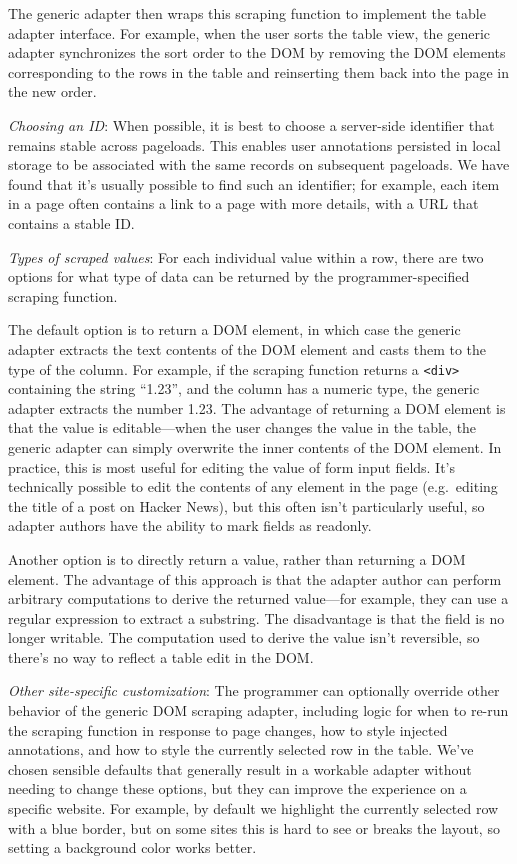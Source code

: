 \documentclass[sigplan,screen,10pt,anonymous,review]{acmart}
\begin{document}
The generic adapter then wraps this scraping function to implement the
table adapter interface. For example, when the user sorts the table
view, the generic adapter synchronizes the sort order to the DOM by
removing the DOM elements corresponding to the rows in the table and
reinserting them back into the page in the new order.

\emph{Choosing an ID}: When possible, it is best to choose a server-side
identifier that remains stable across pageloads. This enables user
annotations persisted in local storage to be associated with the same
records on subsequent pageloads. We have found that it's usually
possible to find such an identifier; for example, each item in a page
often contains a link to a page with more details, with a URL that
contains a stable ID.

\emph{Types of scraped values}: For each individual value within a row,
there are two options for what type of data can be returned by the
programmer-specified scraping function.

The default option is to return a DOM element, in which case the generic
adapter extracts the text contents of the DOM element and casts them to
the type of the column. For example, if the scraping function returns a
\texttt{\textless{}div\textgreater{}} containing the string ``1.23'',
and the column has a numeric type, the generic adapter extracts the
number 1.23. The advantage of returning a DOM element is that the value
is editable---when the user changes the value in the table, the generic
adapter can simply overwrite the inner contents of the DOM element. In
practice, this is most useful for editing the value of form input
fields. It's technically possible to edit the contents of any element in
the page (e.g.~editing the title of a post on Hacker News), but this
often isn't particularly useful, so adapter authors have the ability to
mark fields as readonly.

Another option is to directly return a value, rather than returning a
DOM element. The advantage of this approach is that the adapter author
can perform arbitrary computations to derive the returned value---for
example, they can use a regular expression to extract a substring. The
disadvantage is that the field is no longer writable. The computation
used to derive the value isn't reversible, so there's no way to reflect
a table edit in the DOM.

\emph{Other site-specific customization}: The programmer can optionally
override other behavior of the generic DOM scraping adapter, including
logic for when to re-run the scraping function in response to page
changes, how to style injected annotations, and how to style the
currently selected row in the table. We've chosen sensible defaults that
generally result in a workable adapter without needing to change these
options, but they can improve the experience on a specific website. For
example, by default we highlight the currently selected row with a blue
border, but on some sites this is hard to see or breaks the layout, so
setting a background color works better.
\end{document}
